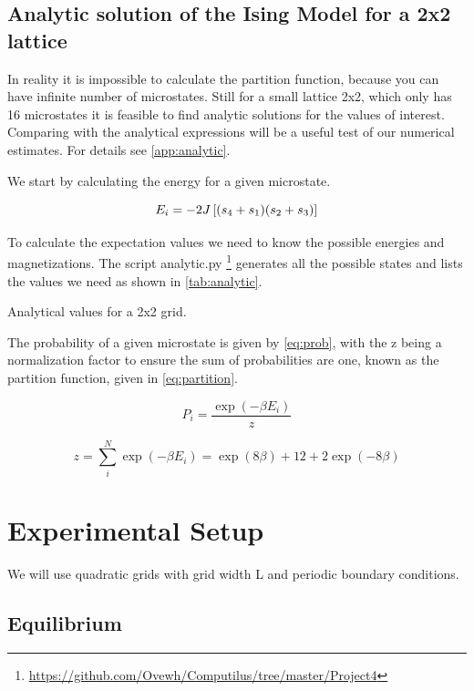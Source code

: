 \subsection{Analytic solution of the Ising Model for a 2x2 lattice}
In reality it is impossible to calculate the partition function, because you can
have infinite number of microstates. Still for a small lattice 2x2, which only
has 16 microstates it is
feasible to find analytic solutions for the values of
interest. Comparing with the analytical expressions will be a useful test of our
numerical estimates. For details see \cref{app:analytic}.

We start by calculating the energy for a given microstate.

\begin{equation}
  E_i = -2J\left[(s_4 + s_1)(s_2+s_3)\right]
\end{equation}

To calculate the expectation values we need to know the possible energies and
magnetizations. The script analytic.py
\footnote{\url{https://github.com/Ovewh/Computilus/tree/master/Project4}}
generates all the possible states and lists the values we need as shown in
\cref{tab:analytic}.

\begin{table}[htp]
  \centering
  \caption{Analytical values for a 2x2 grid.}
  \label{tab:analytic}
\end{table}

The probability of a given microstate is given by \cref{eq:prob}, with the z
being a normalization factor to ensure the sum of probabilities are one, known
as the partition function, given in \cref{eq:partition}.


\begin{equation}
  \label{eq:prob}
  P_i = \frac{\exp(-\beta E_i)}{z}
\end{equation}

\begin{equation}
  \label{eq:partition}
  z = \sum_{i}^{N} \exp(-\beta E_i) = \exp(8\beta) + 12 + 2\exp(-8\beta)
\end{equation}


\section{Experimental Setup}
We will
use quadratic grids with grid width L and periodic
boundary conditions.


\subsection{Equilibrium}

